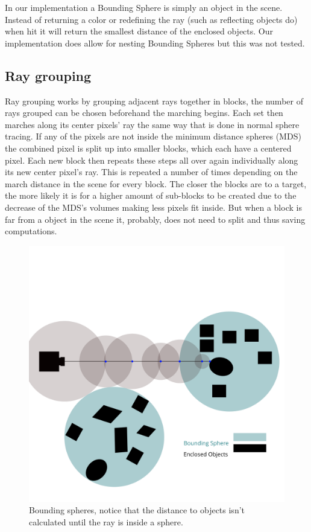 			In our implementation a Bounding Sphere is simply an object in the
			scene. Instead of returning a color or redefining the ray (such 
			as reflecting objects do) when hit it will return the smallest 
			distance of the enclosed objects. Our implementation does allow for
			nesting Bounding Spheres but this was not tested.
			
		\subsection{Ray grouping}
		
			
		
			Ray grouping works by grouping adjacent rays together in blocks, the number of 
			rays grouped can be chosen beforehand the marching begins. Each set 
			then marches along its center pixels' ray the same way that is done 
			in normal sphere tracing. If any of the pixels are not inside the 
			minimum distance spheres (MDS) the combined pixel is split up into 
			smaller blocks, which each have a centered pixel. Each new block 
			then repeats these steps all over again individually along its new 
			center pixel's ray. This is repeated a number of times depending on 
			the march distance in the scene for every block. The closer the blocks 
			are to a target, the more likely it is for a higher amount of sub-blocks 
			to be created due to the decrease of the MDS's volumes making less pixels 
			fit inside. But when a block is far from a object in the scene it, probably, 
			does not need to split and thus saving computations.
			
			


			\begin{figure}[H]
				\centering
				\includegraphics[width=1.0\linewidth]{figure/BoundingSphere} 
				\caption{Bounding spheres, notice that the distance to objects isn't
					calculated until the ray is inside a sphere.}
			\end{figure}



